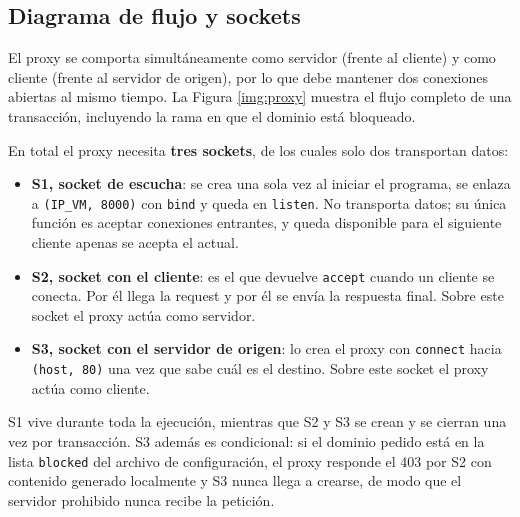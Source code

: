 \documentclass[
	spanish, %
	letterpaper, oneside
]{article}
\newcommand{\code}[1]{\texttt{#1}}    %
\newcommand{\cfgkey}[1]{\texttt{#1}}  %
\newcommand{\status}[1]{#1}           %
\begin{document}
\subsection{Diagrama de flujo y sockets}
El proxy se comporta simultáneamente como servidor (frente al cliente) y como cliente (frente al servidor de origen), por lo que debe mantener dos conexiones abiertas al mismo tiempo.
La Figura \ref{img:proxy} muestra el flujo completo de una transacción, incluyendo la rama en que el dominio está bloqueado.


En total el proxy necesita \textbf{tres sockets}, de los cuales solo dos transportan datos:

\begin{itemize}
	\item \textbf{S1, socket de escucha}: se crea una sola vez al iniciar el programa, se enlaza a \code{(IP\_VM, 8000)} con \code{bind} y queda en \code{listen}. No transporta datos; su única función es aceptar conexiones entrantes, y queda disponible para el siguiente cliente apenas se acepta el actual.
	\item \textbf{S2, socket con el cliente}: es el que devuelve \code{accept} cuando un cliente se conecta. Por él llega la request y por él se envía la respuesta final. Sobre este socket el proxy actúa como servidor.
	\item \textbf{S3, socket con el servidor de origen}: lo crea el proxy con \code{connect} hacia \code{(host, 80)} una vez que sabe cuál es el destino. Sobre este socket el proxy actúa como cliente.
\end{itemize}

S1 vive durante toda la ejecución, mientras que S2 y S3 se crean y se cierran una vez por transacción.
S3 además es condicional: si el dominio pedido está en la lista \cfgkey{blocked} del archivo de configuración, el proxy responde el \status{403} por S2 con contenido generado localmente y S3 nunca llega a crearse, de modo que el servidor prohibido nunca recibe la petición.
\end{document}
